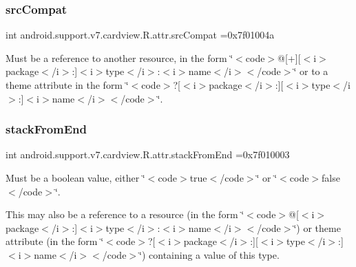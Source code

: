 \subsubsection{\texorpdfstring{src\+Compat}{srcCompat}}
{\footnotesize\ttfamily int android.\+support.\+v7.\+cardview.\+R.\+attr.\+src\+Compat =0x7f01004a\hspace{0.3cm}{\ttfamily [static]}}

Must be a reference to another resource, in the form \char`\"{}$<$code$>$@\mbox{[}+\mbox{]}\mbox{[}$<$i$>$package$<$/i$>$\+:\mbox{]}$<$i$>$type$<$/i$>$\+:$<$i$>$name$<$/i$>$$<$/code$>$\char`\"{} or to a theme attribute in the form \char`\"{}$<$code$>$?\mbox{[}$<$i$>$package$<$/i$>$\+:\mbox{]}\mbox{[}$<$i$>$type$<$/i$>$\+:\mbox{]}$<$i$>$name$<$/i$>$$<$/code$>$\char`\"{}. \mbox{\label{classandroid_1_1support_1_1v7_1_1cardview_1_1R_1_1attr_a13a8615ddb6987faae277ec447427c83}} 
\subsubsection{\texorpdfstring{stack\+From\+End}{stackFromEnd}}
{\footnotesize\ttfamily int android.\+support.\+v7.\+cardview.\+R.\+attr.\+stack\+From\+End =0x7f010003\hspace{0.3cm}{\ttfamily [static]}}

Must be a boolean value, either \char`\"{}$<$code$>$true$<$/code$>$\char`\"{} or \char`\"{}$<$code$>$false$<$/code$>$\char`\"{}. 

This may also be a reference to a resource (in the form \char`\"{}$<$code$>$@\mbox{[}$<$i$>$package$<$/i$>$\+:\mbox{]}$<$i$>$type$<$/i$>$\+:$<$i$>$name$<$/i$>$$<$/code$>$\char`\"{}) or theme attribute (in the form \char`\"{}$<$code$>$?\mbox{[}$<$i$>$package$<$/i$>$\+:\mbox{]}\mbox{[}$<$i$>$type$<$/i$>$\+:\mbox{]}$<$i$>$name$<$/i$>$$<$/code$>$\char`\"{}) containing a value of this type. \mbox{\label{classandroid_1_1support_1_1v7_1_1cardview_1_1R_1_1attr_adea8ad1314d74568d3e4a64ff7a64192}} 
